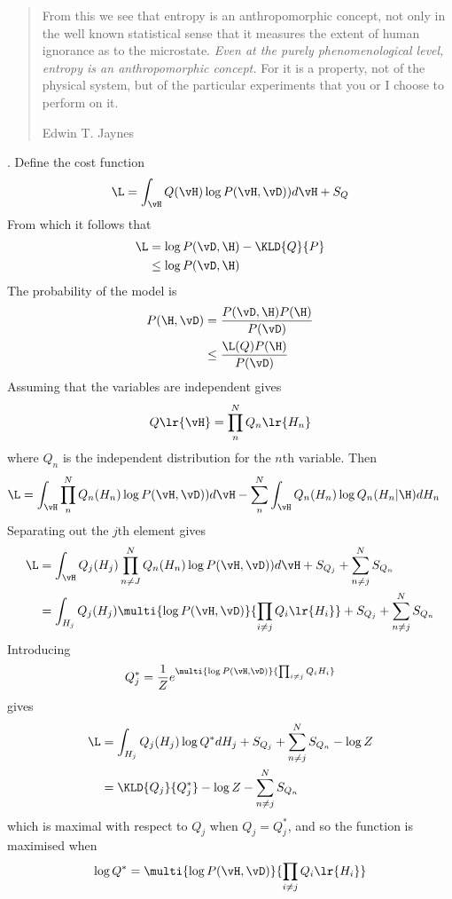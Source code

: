 {{{\begin{quote}
From this we see that entropy is an anthropomorphic concept,
not only in the well known statistical sense that it measures the extent of human ignorance as to the microstate.
{\em Even at the purely phenomenological level, entropy is an anthropomorphic concept.}
For it is a property, not of the physical system,
but of the particular experiments that you or I choose to perform on it.

\flushright Edwin T. Jaynes\cite{Jaynes1965}
\end{quote}
}.
Define the  cost function
\begin{align}
  \L =  \int_\vH Q(\vH) \log P(\vH,\vD) ) d\vH +S_Q  
\end{align}
From which it follows that
\begin{align}
  \L &=   \log P(\vD,\H) - \KLD{Q}{P} \\
     &\le \log P(\vD,\H)
\end{align}
The probability of the model is 
\begin{align}
  P(\H, \vD) &=    \frac{P(\vD, \H) P(\H)}{P(\vD)}\\
             &\le  \frac{\L(Q)P(\H)}{P(\vD)}
\end{align}
Assuming that the variables are independent gives
\begin{align}
Q\lr{\vH} = \prod_n^N Q_n\lr{H_n}
\end{align}
where $Q_n$ is the independent distribution for the $n$th variable.
Then 
\begin{align}
  \L&=  \int_\vH \prod_n^NQ_n(H_n) \log P(\vH,\vD) ) d\vH - \sum_n^N \int_\vH Q_n(H_n)  \log Q_n(H_n|\H) dH_n
\end{align}
Separating out the $j$th element gives
\begin{align}
  \L &= \int_\vH Q_j(H_j)\prod_{n\ne J}^NQ_n(H_n) \log P(\vH,\vD) ) d\vH + S_{Q_j} +  \sum_{n\ne j}^N S_{Q_{n}}
   \\ &= \int_{H_j} Q_j(H_j) \multi{\log P(\vH,\vD)}{\prod_{i\ne j} Q_i\lr{H_i}} +S_{Q_j} +  \sum_{n\ne j}^N S_{Q_{n}}
\end{align}
Introducing
\begin{align}
  Q^\ast_j = \frac{1}{Z}e^{\multi{\log P(\vH,\vD)}{\prod_{i\ne j} Q_i{H_i}}}
\end{align}
gives
\begin{align}
\L &= \int_{H_j} Q_j(H_j) \log Q^\ast dH_j  +S_{Q_j} +  \sum_{n\ne j}^N S_{Q_{n}} - \log Z
\\ &= \KLD{Q_j}{Q^\ast_j}  - \log Z -  \sum_{n\ne j}^N S_{Q_{n}} 
\end{align}
which is maximal with respect to $Q_j$ when $Q_j = Q^\ast_j$, and so the function is maximised when
\begin{align}
  \log Q^\ast = \multi{\log P(\vH,\vD)}{\prod_{i\ne j} Q_i\lr{H_i}}
\end{align}
 
}}
